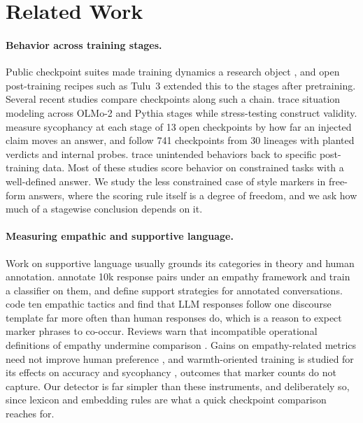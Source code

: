 \documentclass[11pt]{article}
\begin{document}
\section{Related Work}

\paragraph{Behavior across training stages.}
Public checkpoint suites made training dynamics a research object
\citep{biderman2023pythia}, and open post-training recipes such as Tulu~3
\citep{lambert2024tulu3} extended this to the stages after pretraining.
Several recent studies compare checkpoints along such a chain.
\citet{riviere2026developmental} trace situation modeling across OLMo-2 and
Pythia stages while stress-testing construct validity.
\citet{yao2026locating} measure sycophancy at each stage of 13 open
checkpoints by how far an injected claim moves an answer, and
\citet{huang2026development} follow 741 checkpoints from 30 lineages with
planted verdicts and internal probes. \citet{murray2026chunky} trace
unintended behaviors back to specific post-training data. Most of these studies
score behavior on constrained tasks with a well-defined answer. We
study the less constrained case of style markers in free-form answers, where
the scoring rule itself is a degree of freedom, and we ask how much of a
stagewise conclusion depends on it.

\paragraph{Measuring empathic and supportive language.}
Work on supportive language usually grounds its categories in theory and human
annotation. \citet{sharma2020epitome} annotate 10k response pairs under an
empathy framework and train a classifier on them, and
\citet{liu2021emotional} define support strategies for annotated
conversations. \citet{gueorguieva2026templatic} code ten empathic tactics and
find that LLM responses follow one discourse template far more often than
human responses do, which is a reason to expect marker phrases to co-occur.
Reviews warn that incompatible operational definitions of empathy undermine
comparison \citep{lahnala2022critical}. Gains on empathy-related metrics need
not improve human preference \citep{lee2026empathic}, and warmth-oriented
training is studied for its effects on accuracy and sycophancy
\citep{ibrahim2026warm}, outcomes that marker counts do not capture. Our detector is
far simpler than these instruments, and deliberately so, since lexicon and
embedding rules are what a quick checkpoint comparison reaches for.
\end{document}
